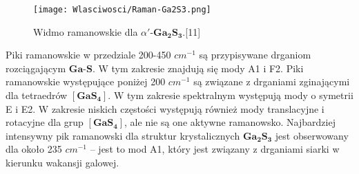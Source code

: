 \begin{figure}[H]
	\begin{center}
		\texttt{[image: Wlasciwosci/Raman-Ga2S3.png]}
		\caption{Widmo ramanowskie dla $\alpha'$-$\mathbf{Ga_{2}S_{3}}$.[11]}
	\end{center}
\end{figure}

Piki ramanowskie w przedziale 200-450 $cm^{-1}$ są przypisywane drganiom rozciągającym $\mathbf{Ga}$-$\mathbf{S}$. W tym zakresie znajdują się mody A1 i F2. Piki ramanowskie występujące poniżej 200 $cm^{-1}$ są związane z drganiami zginającymi dla tetraedrów $[\mathbf{GaS_{4}}]$. 
W tym zakresie spektralnym występują mody o symetrii E i E2. W zakresie niskich częstości występują również mody translacyjne i rotacyjne dla grup $[\mathbf{GaS_{4}}]$, ale nie są one aktywne ramanowsko. Najbardziej intensywny pik ramanowski dla struktur krystalicznych $\mathbf{Ga_{2}S_{3}}$ jest obserwowany dla około 235 $cm^{-1}$ – jest to mod A1, który jest związany z drganiami siarki w kierunku wakansji galowej. 



